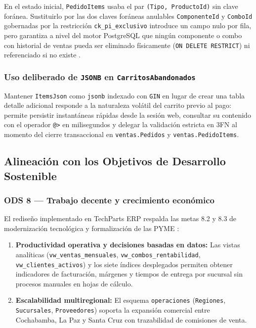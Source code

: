 En el estado inicial, \texttt{PedidoItems} usaba el par \texttt{(Tipo, ProductoId)} sin clave for\'anea.
Sustituirlo por las dos claves for\'aneas anulables \texttt{ComponenteId} y \texttt{ComboId} gobernadas por la restricci\'on \texttt{ck\_pi\_exclusivo} introduce un campo nulo por fila, pero garantiza a nivel del motor PostgreSQL que ning\'un componente o combo con historial de ventas pueda ser eliminado f\'isicamente (\texttt{ON DELETE RESTRICT}) ni referenciado si no existe \citep{date2004, silberschatz2019}.

\subsubsection{Uso deliberado de \texttt{JSONB} en \texttt{CarritosAbandonados}}

Mantener \texttt{ItemsJson} como \texttt{jsonb} indexado con \texttt{GIN} en lugar de crear una tabla detalle adicional responde a la naturaleza vol\'atil del carrito previo al pago: permite persistir instant\'aneas r\'apidas desde la sesi\'on web, consultar su contenido con el operador \texttt{@>} en milisegundos y delegar la validaci\'on estricta en 3FN al momento del cierre transaccional en \texttt{ventas.Pedidos} y \texttt{ventas.PedidoItems}.

\subsection{Alineaci\'on con los Objetivos de Desarrollo Sostenible}

\subsubsection{ODS 8 --- Trabajo decente y crecimiento econ\'omico}

El redise\~no implementado en TechParts ERP respalda las metas 8.2 y 8.3 de modernizaci\'on tecnol\'ogica y formalizaci\'on de las PYME \citep{ods8_2015}:

\begin{enumerate}
  \item \textbf{Productividad operativa y decisiones basadas en datos:} Las vistas anal\'iticas (\texttt{vw\_ventas\_mensuales}, \texttt{vw\_combos\_rentabilidad}, \texttt{vw\_clientes\_activos}) y los siete \'indices desplegados permiten obtener indicadores de facturaci\'on, m\'argenes y tiempos de entrega por sucursal sin procesos manuales en hojas de c\'alculo.
  \item \textbf{Escalabilidad multiregional:} El esquema \texttt{operaciones} (\texttt{Regiones}, \texttt{Sucursales}, \texttt{Proveedores}) soporta la expansi\'on comercial entre Cochabamba, La Paz y Santa Cruz con trazabilidad de comisiones de venta.
\end{enumerate}

